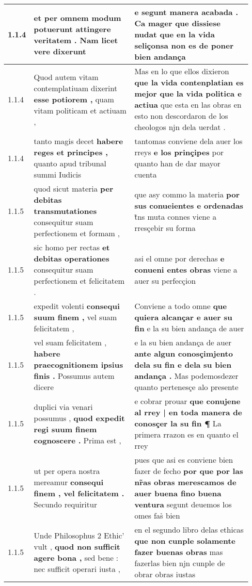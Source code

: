 \begin{tabular}{|p{1cm}|p{6.5cm}|p{6.5cm}|}
1.1.4 & et per omnem modum potuerunt \textbf{ attingere veritatem . } Nam licet vere dixerunt & e segunt manera acabada . \textbf{ Ca mager que dissiese nudat } que en la vida seliçonsa non es de poner bien andança \\\hline
1.1.4 & Quod autem vitam contemplatiuam dixerint \textbf{ esse potiorem , } quam vitam politicam et actiuam , & Mas en lo que ellos dixieron \textbf{ que la vida contenplatian es mejor que la vida politica e actiua } que esta en las obras en esto non descordaron de los cheologos njn dela uerdat . \\\hline
1.1.4 & tanto magis decet \textbf{ habere reges et principes , } quanto apud tribunal summi Iudicis & tantomas conviene dela auer los rreys \textbf{ e los prinçipes } por quanto han de dar mayor cuenta \\\hline
1.1.5 & quod sicut materia \textbf{ per debitas transmutationes } consequitur suam perfectionem et formam , & que asy commo la materia \textbf{ por sus conueientes e ordenadas } t̃ns muta connes viene a rresçebir su forma \\\hline
1.1.5 & sic homo per rectas \textbf{ et debitas operationes } consequitur suam perfectionem et felicitatem . & asi el omne por derechas \textbf{ e conueni entes obras } viene a auer su perfecçion \\\hline
1.1.5 & expedit volenti \textbf{ consequi suum finem , } vel suam felicitatem , & Conviene a todo omne \textbf{ que quiera alcançar e auer su fin } e la su bien andança de auer \\\hline
1.1.5 & vel suam felicitatem , \textbf{ habere praecognitionem ipsius finis . } Possumus autem dicere & e la su bien andança de auer \textbf{ ante algun conosçimjento dela su fin e dela su bien andança . } Mas podemosdezer quanto pertenesçe alo presente \\\hline
1.1.5 & duplici via venari possumus , \textbf{ quod expedit regi suum finem cognoscere . } Prima est , & e cobrar prouar \textbf{ que conujene al rrey | en toda manera de conosçer la su fin ¶ } La primera rrazon es en quanto el rrey \\\hline
1.1.5 & ut per opera nostra mereamur \textbf{ consequi finem , vel felicitatem . } Secundo requiritur & pues que asi es conviene bien fazer de fecho \textbf{ por que por las nr̃as obras merescamos de auer buena fino buena ventura } segunt deuemos los omes fas̉ bien \\\hline
1.1.5 & Unde Philosophus 2 Ethic’ vult , \textbf{ quod non sufficit agere bona , } sed bene : nec sufficit operari iusta , & en el segundo libro delas ethicas \textbf{ que non cunple solamente fazer buenas obras } mas fazerlas bien njn cunple de obrar obras iustas \\\hline

\end{tabular}
